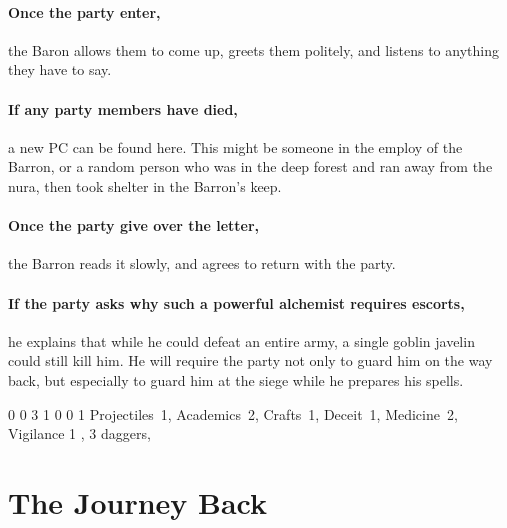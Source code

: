 \begin{multicols}{2}
\paragraph{Once the party enter,}
the Baron allows them to come up, greets them politely, and listens to anything they have to say.


\paragraph{If any party members have died,}
a new PC can be found here.
This might be someone in the employ of the Barron, or a random person who was in the deep forest and ran away from the nura, then took shelter in the Barron's keep.

\paragraph{Once the party give over the letter,}
the Barron reads it slowly, and agrees to return with the party.

\paragraph{If the party asks why such a powerful alchemist requires escorts,}
he explains that while he could defeat an entire army, a single goblin javelin could still kill him.
He will require the party not only to guard him on the way back, but especially to guard him at the siege while he prepares his spells.

{0}%
{0}%
{{3}%
{1}%
{0}}%
{0}%
{1}%
{Projectiles~1, Academics~2, Crafts~1, Deceit~1, Medicine~2, Vigilance 1
}%
{\shortsword, 3 daggers, \partialleather}%
{\addtocounter{fp}{10}}

\end{multicols}

\section{The Journey Back}
\label{siege}

